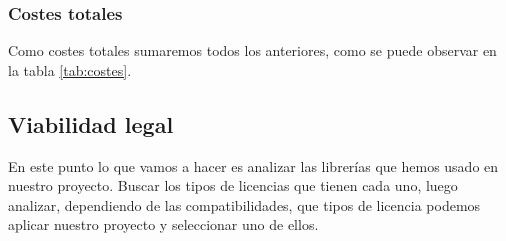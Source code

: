 \subsubsection{Costes totales}
Como costes totales sumaremos todos los anteriores, como se puede observar en la tabla \ref{tab:costes}.

\begin{table}[]
\centering
\caption{Tabla de los costes totales}
\label{tab:costes}
\end{table}

\subsection{Viabilidad legal}
En este punto lo que vamos a hacer es analizar las librerías que hemos usado en nuestro proyecto. Buscar los tipos de licencias que tienen cada uno, luego analizar, dependiendo de las compatibilidades, que tipos de licencia podemos aplicar nuestro proyecto y seleccionar uno de ellos.

